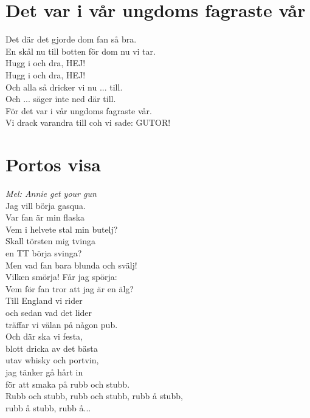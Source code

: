 \documentclass[twoside, openright]{report}
\begin{document}
\section{Det var i vår ungdoms fagraste vår}

Det där det gjorde dom fan så bra.\\
En skål nu till botten för dom nu vi tar.\\
Hugg i och dra, HEJ!\\
Hugg i och dra, HEJ!\\

Och alla så dricker vi nu ... till.\\
Och ... säger inte ned där till.\\

För det var i vår ungdoms fagraste vår.\\
Vi drack varandra till coh vi sade: GUTOR!

\section{Portos visa}
\textit{Mel: Annie get your gun}\\

Jag vill börja gasqua.\\
Var fan är min flaska\\
Vem i helvete stal min butelj?\\
Skall törsten mig tvinga\\
en TT börja svinga?\\
Men vad fan bara blunda och svälj!\\
Vilken smörja! Får jag spörja:\\
Vem för fan tror att jag är en älg?\\
Till England vi rider\\
och sedan vad det lider\\
träffar vi välan på någon pub.\\
Och där ska vi festa,\\
blott dricka av det bästa\\
utav whisky och portvin,\\
jag tänker gå hårt in\\
för att smaka på rubb och stubb.\\

Rubb och stubb, rubb och stubb, rubb å stubb,\\
rubb å stubb, rubb å...\\
\end{document}
